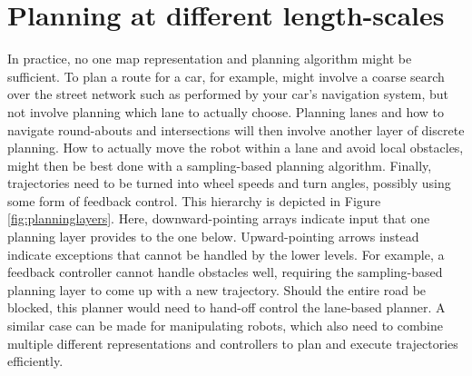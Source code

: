 \section{Planning at different length-scales}
In practice, no one map representation and planning algorithm might be sufficient. To plan a route for a car, for example, might involve a coarse search over the street network such as performed by your car's navigation system, but not involve planning which lane to actually choose. Planning lanes and how to navigate round-abouts and intersections will then involve another layer of discrete planning. How to actually move the robot within a lane and avoid local obstacles, might then be best done with a sampling-based planning algorithm. Finally, trajectories need to be turned into wheel speeds and turn angles, possibly using some form of feedback control. This hierarchy is depicted in Figure \ref{fig:planninglayers}. Here, downward-pointing arrays indicate input that one planning layer provides to the one below. Upward-pointing arrows instead indicate exceptions that cannot be handled by the lower levels. For example, a feedback controller cannot handle obstacles well, requiring the sampling-based planning layer to come up with a new trajectory. Should the entire road be blocked, this planner would need to hand-off control the lane-based planner. A similar case can be made for manipulating robots, which also need to combine multiple different representations and controllers to plan and execute trajectories efficiently.

